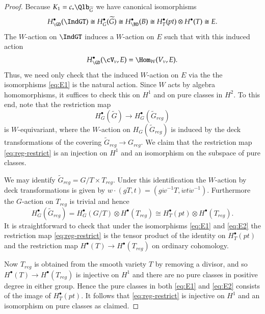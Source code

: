 \documentclass[12pt]{amsart}
\def\to{\rightarrow}
\theoremstyle{remark}
\begin{document}
\begin{proof}
Because $K_1 = c_* \Qlb_{\widetilde{G}}$ we have canonical isomorphisms
\begin{equation} \label{eq:E1}
H^\bullet_{\GD}(\IndGT)\cong H^\bullet_G(\widetilde{G}) \cong H^\bullet_{\BD}(B)\cong H^{\bullet}_T(pt) \otimes H^{\bullet}(T) \cong E.
\end{equation}
The $W$-action on $\IndGT$ induces a $W$-action on $E$ such that with this induced action 
\[
H^\bullet_{\GD}(\cV_\nu,E)= \Hom_W (V_\nu, E).
\]  
Thus, we need only check that the induced $W$-action on $E$ via the the isomorphisms \eqref{eq:E1} is the natural action.  Since $W$ acts by algebra homomorphisms, it suffices to check this on $H^1$ and on pure classes in $H^2$. To this end, note that the restriction map
\begin{equation} \label{eq:reg-restrict}
H^\bullet_G(\widetilde{G}) \to H^\bullet_G(\widetilde{G}_{reg})
\end{equation}
is $W$-equivariant, where the $W$-action on $H_G(\widetilde{G}_{reg})$ is induced by the deck transformations of the covering $\widetilde{G}_{reg} \to G_{reg}$. We claim that the restriction map \eqref{eq:reg-restrict} is an injection on $H^1$ and an isomorphism on the subspace of pure classes.

We may identify $\widetilde{G}_{reg} = G/T \times T_{reg}$. Under this identification the $W$-action by deck transformations is given by $w \cdot (gT, t) = (g\dot{w}^{-1}T, \dot{w}t\dot{w}^{-1})$. Furthermore the $G$-action on $T_{reg}$ is trivial and hence
\begin{equation} \label{eq:E2}
H^\bullet_G(\widetilde{G}_{reg}) = H^\bullet_G(G/T) \otimes H^{\bullet}(T_{reg}) \cong H^\bullet_T(pt) \otimes H^{\bullet}(T_{reg}).
\end{equation}
It is straightforward to check that under the isomorphisms \eqref{eq:E1} and \eqref{eq:E2} the restriction map \eqref{eq:reg-restrict} is the tensor product of the identity on $H_T^{\bullet}(pt)$ and the restriction map $H^\bullet(T) \to H^\bullet(T_{reg})$ on ordinary cohomology.

Now $T_{reg}$ is obtained from the smooth variety $T$ by removing a divisor, and so $H^{\bullet}(T) \to H^{\bullet}(T_{reg})$ is injective on $H^1$ and there are no pure classes in positive degree in either group. Hence the pure classes in both \eqref{eq:E1} and \eqref{eq:E2} consists of the image of $H^{\bullet}_T(pt)$. It follows that \eqref{eq:reg-restrict} is injective on $H^1$ and an isomorphism on pure classes as claimed.


\end{proof}
\end{document}
